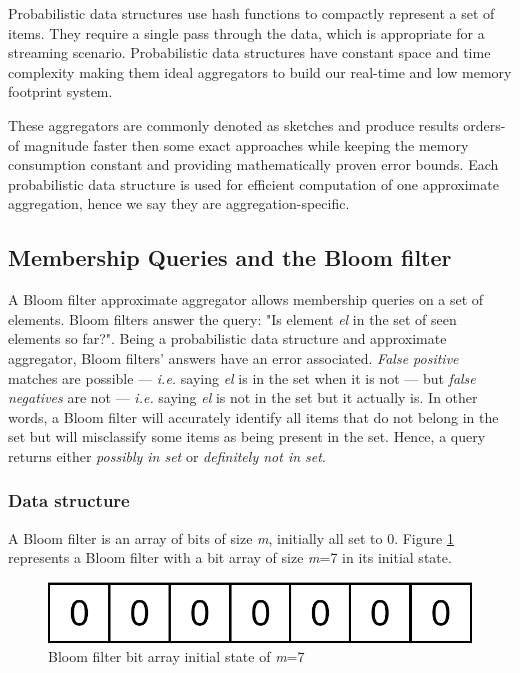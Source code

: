 Probabilistic data structures use hash functions to compactly represent a set of items. They require a single pass through the data, which is appropriate for a streaming scenario. Probabilistic data structures have constant space and time complexity \cite{Singh-PDS-BIGD} making them ideal aggregators to build our real-time and low memory footprint system. 

These aggregators are commonly denoted as sketches and produce results orders-of magnitude faster then some exact approaches while keeping the memory consumption constant and providing mathematically proven error bounds. Each probabilistic data structure is used for efficient computation of one approximate aggregation, hence we say they are aggregation-specific.


\subsection{Membership Queries and the Bloom filter} \label{sec:bloom}
A Bloom filter \cite{BLOOM-BLOOMFILTER} approximate aggregator allows membership queries on a set of elements. Bloom filters answer the query: "Is element \textit{el} in the set of seen elements so far?". Being a probabilistic data structure and approximate aggregator, Bloom filters' answers have an error associated. \textit{False positive} matches are possible --- \textit{i.e.} saying \textit{el} is in the set when it is not --- but \textit{false negatives} are not --- \textit{i.e.} saying \textit{el} is not in the set but it actually is. In other words, a Bloom filter will accurately identify all items that do not belong in the set but will misclassify some items as being present in the set. Hence, a query returns either \textit{possibly in set} or \textit{definitely not in set}.

\subsubsection*{Data structure}
A Bloom filter is an array of bits of size \textit{m}, initially all set to 0. Figure \ref{fig:initial-bloom-filter} represents a Bloom filter with a bit array of size \textit{m}=7 in its initial state.

\begin{figure}[!htb]
    \begin{center}
      \includegraphics[scale=1.1]{figures/initial-bloom.png}
      \caption[Bloom filter initial state]{Bloom filter bit array initial state of \textit{m}=7}
      \label{fig:initial-bloom-filter}
    \end{center}
\end{figure}

